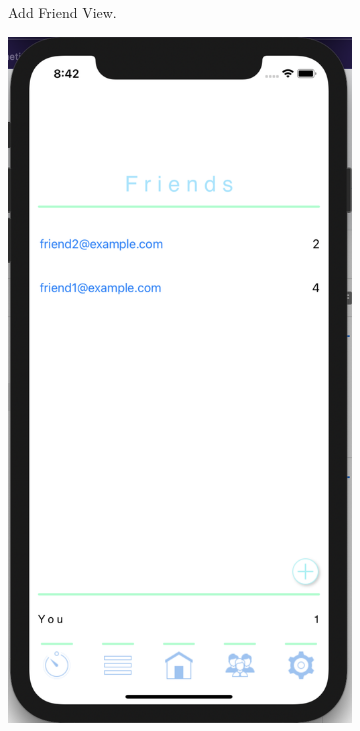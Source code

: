 \begin{figure}[H]
\begin{subfigure}[b]{0.3\textwidth}
        \caption{Add Friend View.}
        \label{fig:add_friend_app}
    \end{subfigure}
    \hfill
    \begin{subfigure}[b]{0.3\textwidth}
        \centering
        \includegraphics[width=\textwidth]{./graphics/Implementation/Friends/friends1.png}

\end{subfigure}
\end{figure}
